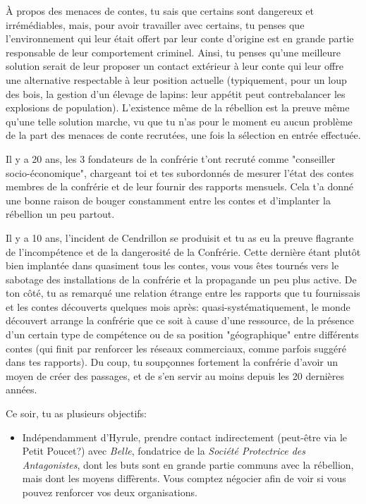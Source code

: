 {	\par À propos des menaces de contes, tu sais que certains sont dangereux et irrémédiables, mais, pour avoir travailler avec certains, tu penses que l'environnement qui leur était offert par leur conte d'origine est en grande partie responsable de leur comportement criminel. Ainsi, tu penses qu'une meilleure solution serait de leur proposer un contact extérieur à leur conte qui leur offre une alternative respectable à leur position actuelle (typiquement, pour un loup des bois, la gestion d'un élevage de lapins: leur appétit peut contrebalancer les explosions de population). L'existence même de la rébellion est la preuve même qu'une telle solution marche, vu que tu n'as pour le moment eu aucun problème de la part des menaces de conte recrutées, une fois la sélection en entrée effectuée.
	
	\par Il y a 20 ans, les 3 fondateurs de la confrérie t'ont recruté comme "conseiller socio-économique", chargeant toi et tes subordonnés de mesurer l'état des contes membres de la confrérie et de leur fournir des rapports mensuels. Cela t'a donné une bonne raison de bouger constamment entre les contes et d'implanter la rébellion un peu partout.
	
	\par Il y a 10 ans, l'incident de Cendrillon se produisit et tu as eu la preuve flagrante de l'incompétence et de la dangerosité de la Confrérie. Cette dernière étant plutôt bien implantée dans quasiment tous les contes, vous vous êtes tournés vers le sabotage des installations de la confrérie et la propagande un peu plus active. De ton côté, tu as remarqué une relation étrange entre les rapports que tu fournissais et les contes découverts quelques mois après: quasi-systématiquement, le monde découvert arrange la confrérie que ce soit à cause d'une ressource, de la présence d'un certain type de compétence ou de sa position "géographique" entre différents contes (qui finit par renforcer les réseaux commerciaux, comme parfois suggéré dans tes rapports). Du coup, tu soupçonnes fortement la confrérie d'avoir un moyen de créer des passages, et de s'en servir au moins depuis les 20 dernières années.
	
	\par Ce soir, tu as plusieurs objectifs:
	\begin{itemize}
		\item Indépendamment d'Hyrule, prendre contact indirectement (peut-être via le Petit Poucet?) avec \emph{Belle}, fondatrice de la \emph{Société Protectrice des Antagonistes}, dont les buts sont en grande partie communs avec la rébellion, mais dont les moyens diffèrents. Vous comptez négocier afin de voir si vous pouvez renforcer vos deux organisations.
		

\end{itemize}}
